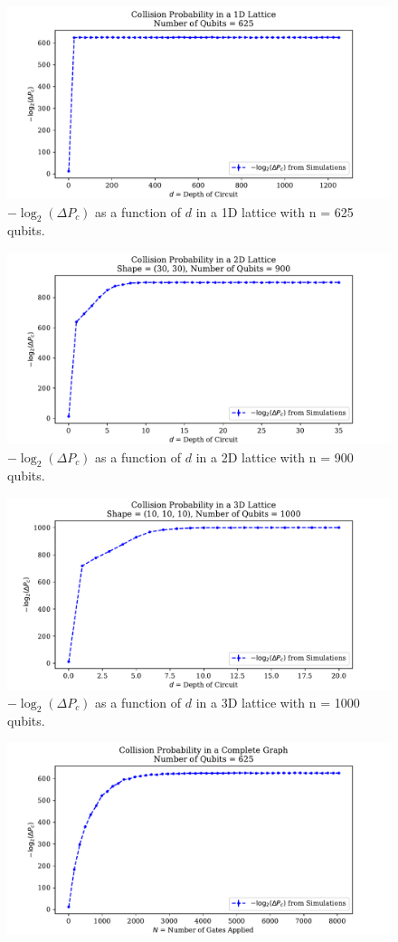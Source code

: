 \documentclass[11pt]{article}
\theoremstyle{definition}
\theoremstyle{plain}
\begin{document}
{\begin{figure}[!htb]
\centering
\includegraphics[width=.8\textwidth]{figures/1D/cp_std_log.pdf}
\caption{$-\log_2(\Delta P_c)$ as a function of $d$ in a 1D lattice with n = 625 qubits.}
\label{fig_1d_std}
\end{figure}
\begin{figure}[!htb]
\centering
\includegraphics[width=.8\textwidth]{figures/2D/cp_std_log.pdf}
\caption{$-\log_2(\Delta P_c)$ as a function of $d$ in a 2D lattice with n = 900 qubits.}
\label{fig_2d_std}
\end{figure}
\begin{figure}[!htb]
\centering
\includegraphics[width=.8\textwidth]{figures/3D/cp_std_log.pdf}
\caption{$-\log_2(\Delta P_c)$ as a function of $d$ in a 3D lattice with n = 1000 qubits.}
\label{fig_3d_std}
\end{figure}
\begin{figure}[!htb]
\centering
\includegraphics[width=.8\textwidth]{figures/CG/cp_std_log.pdf}

\end{figure}}
\end{document}
